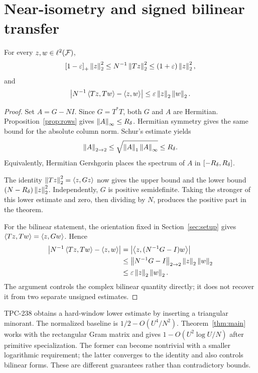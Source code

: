 \section{Near-isometry and signed bilinear transfer}\label{sec:operator}

\begin{theorem}\label{thm:main}
For every $z,w\in\ell^2(\mathcal{F})$,
\[
\left[1-\varepsilon\right]_{+}\left\lVert z\right\rVert_2^2
\leq N^{-1}\left\lVert Tz\right\rVert_2^2
\leq(1+\varepsilon)\left\lVert z\right\rVert_2^2,
\]
and
\[
\left\lvert N^{-1}\left\langle Tz,Tw\right\rangle-\left\langle z,w\right\rangle\right\rvert
\leq\varepsilon\left\lVert z\right\rVert_2\left\lVert w\right\rVert_2.
\]
\end{theorem}

\begin{proof}
Set $A=G-NI$.  Since $G=T^*T$, both $G$ and $A$ are Hermitian.
Proposition~\ref{prop:rows} gives
$\left\lVert A\right\rVert_\infty\leq R_{\delta}$.  Hermitian symmetry gives the same bound for the
absolute column norm.  Schur's estimate yields
\[
\left\lVert A\right\rVert_{2\to2}
\leq\sqrt{\left\lVert A\right\rVert_1\left\lVert A\right\rVert_\infty}
\leq R_{\delta}.
\]
Equivalently, Hermitian Gershgorin places the spectrum of $A$ in
$[-R_{\delta},R_{\delta}]$.

The identity $\left\lVert Tz\right\rVert_2^2=\left\langle z,Gz\right\rangle$ now gives the upper bound and the
lower bound $(N-R_{\delta})\left\lVert z\right\rVert_2^2$.  Independently, $G$ is positive
semidefinite.  Taking the stronger of this lower estimate and zero, then
dividing by $N$, produces the positive part in the theorem.

For the bilinear statement, the orientation fixed in
Section~\ref{sec:setup} gives $\left\langle Tz,Tw\right\rangle=\left\langle z,Gw\right\rangle$.  Hence
\[
\begin{aligned}
\left\lvert N^{-1}\left\langle Tz,Tw\right\rangle-\left\langle z,w\right\rangle\right\rvert
&=\left\lvert \left\langle z,(N^{-1}G-I)w\right\rangle\right\rvert\\
&\leq\left\lVert N^{-1}G-I\right\rVert_{2\to2}\left\lVert z\right\rVert_2\left\lVert w\right\rVert_2\\
&\leq\varepsilon\left\lVert z\right\rVert_2\left\lVert w\right\rVert_2.
\end{aligned}
\]
The argument controls the complex bilinear quantity directly; it does not
recover it from two separate unsigned estimates.
\end{proof}

\begin{remark}
TPC-238 obtains a hard-window lower estimate by inserting a triangular
minorant.  The normalized baseline is
$1/2-O(U^4/N^2)$.  Theorem~\ref{thm:main} works with the rectangular Gram
matrix and gives $1-O(U^2\log U/N)$ after primitive specialization.  The
former can become nontrivial with a smaller logarithmic requirement; the
latter converges to the identity and also controls bilinear forms.  These are
different guarantees rather than contradictory bounds.
\end{remark}
